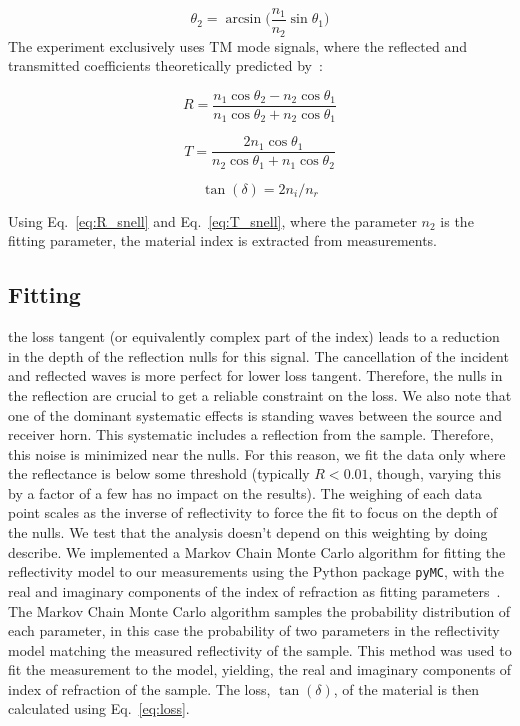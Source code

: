 \begin{equation}
    \theta_2 = \arcsin\bigg(\frac{n_1}{n_2}\sin\theta_1\bigg)
    \label{eq:snell}
\end{equation}
The experiment exclusively uses TM mode signals, where the reflected and transmitted coefficients theoretically
predicted by~\cite{jackson}:

\begin{equation}
    R = \frac{n_1 \cos\theta_2 - n_2\cos\theta_1}{n_1\cos\theta_2 + n_2\cos\theta_1}
    \label{eq:R_snell}
\end{equation}

\begin{equation}
    T = \frac{2 n_1 \cos\theta_1}{n_2\cos\theta_1 + n_1\cos\theta_2}
    \label{eq:T_snell}
\end{equation}

\begin{equation}
    \tan(\delta) = 2n_i/n_r
    \label{eq:loss}
\end{equation}

Using Eq.~\ref{eq:R_snell} and Eq.~\ref{eq:T_snell}, where the parameter $n_2$ is the fitting parameter, the material index is extracted from measurements. 

\subsection{Fitting}
the loss tangent (or equivalently complex part of the index) leads to a reduction in the depth of the reflection nulls for this signal. The cancellation of the incident and reflected waves is more perfect for lower loss tangent. Therefore, the nulls in the reflection are crucial to get a reliable constraint on the loss. We also note that one of the dominant systematic effects is standing waves between the source and receiver horn. This systematic includes a reflection from the sample. Therefore, this noise is minimized near the nulls. For this reason, we fit the data only where the reflectance is below some threshold (typically $R<0.01$, though, varying this by a factor of a few has no impact on the results). The weighing of each data point scales as the inverse of reflectivity to force the fit to focus on the depth of the nulls. We test that the analysis doesn’t depend on this weighting by doing describe. We implemented a Markov Chain Monte Carlo algorithm for fitting the reflectivity model to our measurements using the Python package \verb|pyMC|, with the real and imaginary components of the index of refraction as fitting parameters~\cite{Patil2010PyMCBS}. The Markov Chain Monte Carlo algorithm samples the probability distribution of each parameter, in this case the probability of two parameters in the reflectivity model matching the measured reflectivity of the sample. This method was used to fit the measurement to the model, yielding, the real and imaginary components of index of refraction of the sample. The loss, $\tan(\delta)$, of the material is then calculated using Eq.~\ref{eq:loss}.


